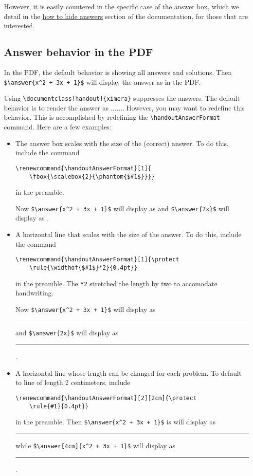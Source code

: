 \documentclass{ximera}
\begin{document}
            However, it is easily countered in the specific case of the answer box, which we detail in the \href{https://xronos.clas.ufl.edu/examples/exampleCore/supplemental/hiddenAnswers}{how to hide answers} section of the documentation, for those that are interested.
        
    \subsection*{Answer behavior in the PDF}

        In the PDF, the default behavior is showing all answers and solutions. Then \verb|$\answer{x^2 + 3x + 1}$| will display the answer as  in the PDF.
                
        Using \verb|\documentclass[handout]{ximera}| suppresses the answers. The default behavior is to render the answer as $\ldots\ldots$. However, you may want to redefine this behavior. This is accomplished by redefining the \verb|\handoutAnswerFormat| command. Here are a few examples:
        \begin{itemize}
            \item The answer box scales with the size of the (correct) answer. To do this, include the command 
            \begin{verbatim}
\renewcommand{\handoutAnswerFormat}[1]{
    \fbox{\scalebox{2}{\phantom{$#1$}}}}
            \end{verbatim}
            in the preamble. 
            
            Now \verb|$\answer{x^2 + 3x + 1}$| will display as \fbox{\scalebox{2}{\phantom{$x^2 + 3x + 1$}}} and \verb|$\answer{2x}$| will display as \fbox{\scalebox{2}{\phantom{$2x$}}}.
                
            \item A horizontal line that scales with the size of the answer. To do this, include the command 
            \begin{verbatim}
\renewcommand{\handoutAnswerFormat}[1]{\protect
    \rule{\widthof{$#1$}*2}{0.4pt}}
            \end{verbatim}
            in the preamble. The \verb|*2| stretched the length by two to accomodate handwriting.

            Now \verb|$\answer{x^2 + 3x + 1}$| will display as
            \rule{*2}{0.4pt} and \verb|$\answer{2x}$| will display as \rule{*2}{0.4pt}.

            \item A horizontal line whose length can be changed for each problem. To default to line of length 2 centimeters, include 
            \begin{verbatim}
\renewcommand{\handoutAnswerFormat}[2][2cm]{\protect
    \rule{#1}{0.4pt}}
            \end{verbatim}
            in the preamble. Then \verb|$\answer{x^2 + 3x + 1}$| is   will display as \rule{2 cm}{0.4pt} while \verb|$\answer[4cm]{x^2 + 3x + 1}$| will display as \rule{4cm}{0.4pt}.
        \end{itemize}
    
        
    
\end{document}
